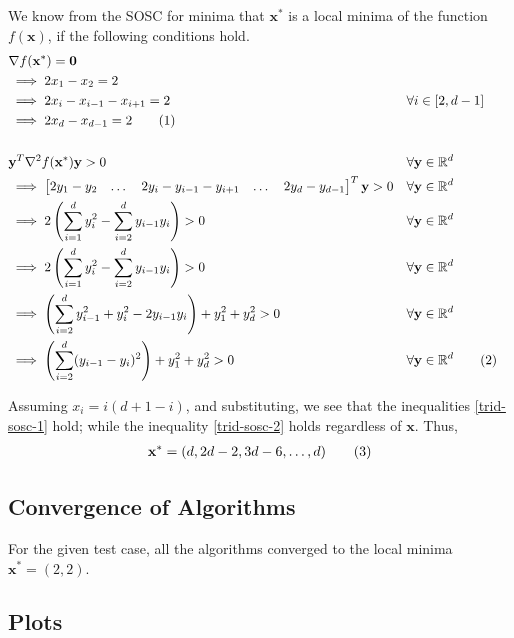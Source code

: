 \documentclass[a4paper]{article}
\newcommand\numberthis{\addtocounter{equation}{1}\tag{\theequation}}
\begin{document}
We know from the SOSC for minima that $\textbf{x}^*$ is a local minima of the function $f(\textbf{x})$, if the following conditions hold.
\begin{align*}
&\nabla f(\textbf{x}^*) = \textbf{0} \\
&\implies{} 2 x_1 - x_2 = 2 \\ 
&\implies{} 2 x_{i} - x_{i-1} - x_{i+1} = 2 &&\forall i \in [2, d-1] \\
&\implies{} 2 x_d - x_{d-1} = 2 \numberthis \label{trid-sosc-1} \\ \\
&\textbf{y}^T \nabla^2 f(\textbf{x}^*) \textbf{y} > 0 &&\forall \textbf{y} \in \mathbb{R}^d \\
&\implies \begin{bmatrix} 2y_1 - y_2 & \dots & 2y_i - y_{i-1} - y_{i+1} & \dots & 2y_{d} - y_{d-1} \end{bmatrix} ^T \textbf{y} > 0 &&\forall \textbf{y} \in \mathbb{R}^d \\
&\implies 2 \left(\sum_{i=1}^d y_i^2 - \sum_{i=2}^d y_{i-1} y_i\right) > 0 &&\forall \textbf{y} \in \mathbb{R}^d \\
&\implies 2 \left(\sum_{i=1}^d y_i^2 - \sum_{i=2}^d y_{i-1} y_i\right) > 0 &&\forall \textbf{y} \in \mathbb{R}^d \\
&\implies \left(\sum_{i=2}^d y_{i-1}^2 + y_i^2 - 2y_{i-1} y_i\right) + y_1^2 + y_d^2 > 0 &&\forall \textbf{y} \in \mathbb{R}^d \\
&\implies \left(\sum_{i=2}^d (y_{i-1} - y_i)^2 \right) + y_1^2 + y_d^2 > 0 &&\forall \textbf{y} \in \mathbb{R}^d \numberthis \label{trid-sosc-2}
\end{align*}

Assuming $x_i = i(d + 1 - i)$, and substituting, we see that the inequalities \eqref{trid-sosc-1} hold; while the inequality \eqref{trid-sosc-2} holds regardless of $\textbf{x}$. Thus,
\begin{align*}
\textbf{x}^* = (d, 2d - 2, 3d - 6, \ldots{}, d) \numberthis \label{trid-minima}
\end{align*}

\subsection{Convergence of Algorithms}

For the given test case, all the algorithms converged to the local minima $\textbf{x}^* = (2, 2)$.

\subsection{Plots}
\end{document}
